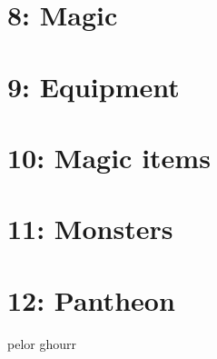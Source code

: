 \documentclass[a4paper]{article}
\begin{document}
\section{8: Magic}

\section{9: Equipment}

\section{10: Magic items}

\section{11: Monsters}

\section{12: Pantheon}
pelor ghourr
\end{document}
